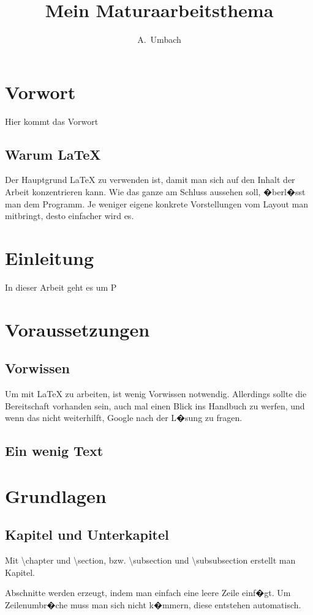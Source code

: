 \documentclass[a4paper,11pt]{report}
\author{A.~Umbach}
\title{Mein Maturaarbeitsthema}
\begin{document}
\maketitle
\tableofcontents

\chapter{Vorwort}
Hier kommt das Vorwort
\section{Warum \LaTeX{}}
Der Hauptgrund \LaTeX{} zu verwenden ist, damit man sich auf den Inhalt der Arbeit konzentrieren kann. Wie das ganze am Schluss aussehen soll, �berl�sst man dem Programm. Je weniger eigene konkrete Vorstellungen vom Layout man mitbringt, desto einfacher wird es.
\chapter{Einleitung}
In dieser Arbeit geht es um P

\chapter{Voraussetzungen}
\section{Vorwissen}
Um mit \LaTeX{} zu arbeiten, ist wenig Vorwissen notwendig. Allerdings sollte die Bereitschaft vorhanden sein, auch mal einen Blick ins Handbuch zu werfen, und wenn das nicht weiterhilft, Google nach der L�sung zu fragen.

\section{Ein wenig Text}
\blindtext

\chapter{Grundlagen}
\section{Kapitel und Unterkapitel}
\label{kapitelunterkapitel}
Mit \textbackslash chapter und \textbackslash section, bzw. \textbackslash subsection und \textbackslash subsubsection erstellt man Kapitel.

Abschnitte werden erzeugt, indem man einfach eine leere Zeile einf�gt. Um
Zeilenumbr�che muss man sich nicht k�mmern, diese entstehen automatisch.
\end{document}
